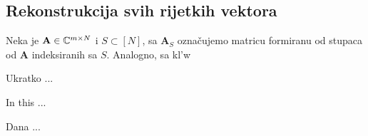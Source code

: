 \documentclass[a4paper,twoside,12pt]{memoir} %
\newcommand{\vect}[1]{\mathbf{#1}}
\begin{document}
\subsection[Rekonstrukcija svih rijetkih vektora][Rekonstrukcija svih rijetkih vektora]{Rekonstrukcija svih rijetkih vektora}
Neka je $\vect{A} \in \C^{m \times N}$ i $S \subset [N]$, sa $\vect A_S$ ozna\v{c}ujemo matricu formiranu od stupaca od $\vect A$ indeksiranih sa $S$. Analogno, sa kl'w





\nocite{*}



\pagestyle{empty} %


\begin{sazetak}
Ukratko ...
\end{sazetak}

\begin{summary}
In this ...
\end{summary}


\begin{cv}
Dana ...
\end{cv}
\end{document}
